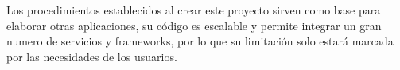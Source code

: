 Los procedimientos establecidos al crear este proyecto sirven como base para elaborar otras aplicaciones, su código es escalable y permite integrar un gran numero de servicios y \glspl{framework}, por lo que su limitación solo estará marcada por las necesidades de los usuarios.
\vspace{0.8cm}


